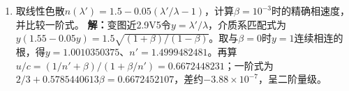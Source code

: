 \documentclass[UTF8,fontset=fandol,a4paper,11pt]{ctexart}
\begin{document}
\begin{enumerate}
\item 取线性色散$n(\lambda')=1.5-0.05(\lambda'/\lambda-1)$，计算$\beta=10^{-3}$时的精确相速度，并比较一阶式。
\textbf{解：}变图近2.9V5令$y=\lambda'/\lambda$，介质系匹配式为$y(1.55-0.05y)=1.5\sqrt{(1+\beta)/(1-\beta)}$。取与$\beta=0$时$y=1$连续相连的根，得$y=1.0010350375$、$n'=1.4999482481$。再算$u/c=(1/n'+\beta)/(1+\beta/n')=0.6672448231$；一阶式为$2/3+0.5785440613\beta=0.6672452107$，差约$-3.88\times10^{-7}$，呈二阶量级。
\begin{center}\begin{minipage}{.98\linewidth}\centering
{}
\end{minipage}
\end{center}
\end{enumerate}
\end{document}
